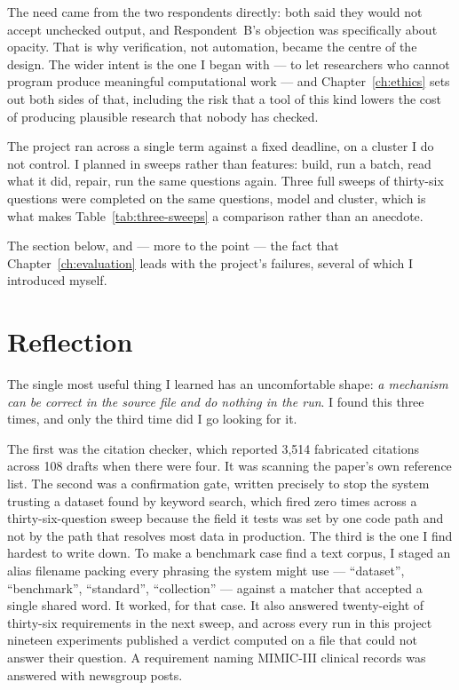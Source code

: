 \begin{description}[style=unboxed,leftmargin=0pt,itemsep=0.4em]
\item[Meeting a real need in a wider context.] The need came from the two
respondents directly: both said they would not accept unchecked output, and
Respondent~B's objection was specifically about opacity. That is why verification,
not automation, became the centre of the design. The wider intent is the one I
began with --- to let researchers who cannot program produce meaningful
computational work --- and Chapter~\ref{ch:ethics} sets out both sides of that,
including the risk that a tool of this kind lowers the cost of producing plausible
research that nobody has checked.

\item[Self-management of a significant piece of work.] The project ran across a
single term against a fixed deadline, on a cluster I do not control. I planned in
sweeps rather than features: build, run a batch, read what it did, repair, run the
same questions again. Three full sweeps of thirty-six questions were completed on
the same questions, model and cluster, which is what makes
Table~\ref{tab:three-sweeps} a comparison rather than an anecdote.

\item[Critical self-evaluation.] The section below, and --- more to the point --- the
fact that Chapter~\ref{ch:evaluation} leads with the project's failures, several of
which I introduced myself.

\end{description}

\section{Reflection}

The single most useful thing I learned has an uncomfortable shape: \emph{a
mechanism can be correct in the source file and do nothing in the run}. I found
this three times, and only the third time did I go looking for it.

The first was the citation checker, which reported 3{,}514 fabricated citations
across 108 drafts when there were four. It was scanning the paper's own reference
list. The second was a confirmation gate, written precisely to stop the system
trusting a dataset found by keyword search, which fired zero times across a
thirty-six-question sweep because the field it tests was set by one code path and
not by the path that resolves most data in production. The third is the one I find
hardest to write down. To make a benchmark case find a text corpus, I staged an
alias filename packing every phrasing the system might use --- ``dataset'',
``benchmark'', ``standard'', ``collection'' --- against a matcher that accepted a
single shared word. It worked, for that case. It also answered twenty-eight of
thirty-six requirements in the next sweep, and across every run in this project
nineteen experiments published a verdict computed on a file that could not answer
their question. A requirement naming MIMIC-III clinical records was answered with
newsgroup posts.

